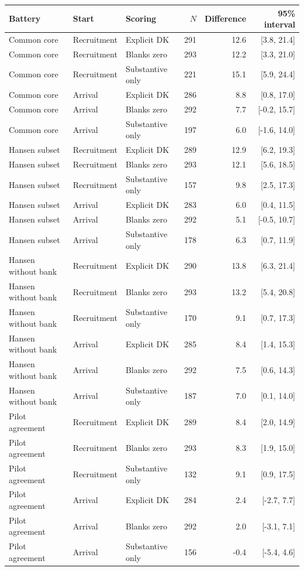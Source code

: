 \begin{tabular}{lllrrr}
\toprule
Battery & Start & Scoring & $N$ & Difference & 95\% interval \\
\midrule
Common core & Recruitment & Explicit DK & 291 & 12.6 & [3.8, 21.4] \\
Common core & Recruitment & Blanks zero & 293 & 12.2 & [3.3, 21.0] \\
Common core & Recruitment & Substantive only & 221 & 15.1 & [5.9, 24.4] \\
Common core & Arrival & Explicit DK & 286 & 8.8 & [0.8, 17.0] \\
Common core & Arrival & Blanks zero & 292 & 7.7 & [-0.2, 15.7] \\
Common core & Arrival & Substantive only & 197 & 6.0 & [-1.6, 14.0] \\
Hansen subset & Recruitment & Explicit DK & 289 & 12.9 & [6.2, 19.3] \\
Hansen subset & Recruitment & Blanks zero & 293 & 12.1 & [5.6, 18.5] \\
Hansen subset & Recruitment & Substantive only & 157 & 9.8 & [2.5, 17.3] \\
Hansen subset & Arrival & Explicit DK & 283 & 6.0 & [0.4, 11.5] \\
Hansen subset & Arrival & Blanks zero & 292 & 5.1 & [-0.5, 10.7] \\
Hansen subset & Arrival & Substantive only & 178 & 6.3 & [0.7, 11.9] \\
Hansen without bank & Recruitment & Explicit DK & 290 & 13.8 & [6.3, 21.4] \\
Hansen without bank & Recruitment & Blanks zero & 293 & 13.2 & [5.4, 20.8] \\
Hansen without bank & Recruitment & Substantive only & 170 & 9.1 & [0.7, 17.3] \\
Hansen without bank & Arrival & Explicit DK & 285 & 8.4 & [1.4, 15.3] \\
Hansen without bank & Arrival & Blanks zero & 292 & 7.5 & [0.6, 14.3] \\
Hansen without bank & Arrival & Substantive only & 187 & 7.0 & [0.1, 14.0] \\
Pilot agreement & Recruitment & Explicit DK & 289 & 8.4 & [2.0, 14.9] \\
Pilot agreement & Recruitment & Blanks zero & 293 & 8.3 & [1.9, 15.0] \\
Pilot agreement & Recruitment & Substantive only & 132 & 9.1 & [0.9, 17.5] \\
Pilot agreement & Arrival & Explicit DK & 284 & 2.4 & [-2.7, 7.7] \\
Pilot agreement & Arrival & Blanks zero & 292 & 2.0 & [-3.1, 7.1] \\
Pilot agreement & Arrival & Substantive only & 156 & -0.4 & [-5.4, 4.6] \\
\bottomrule
\end{tabular}
